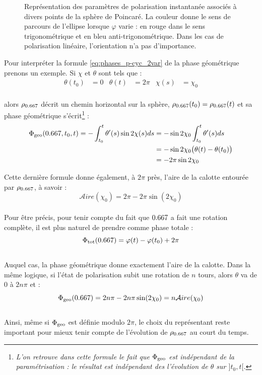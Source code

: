 \begin{figure}[H]
	
	\caption[\DONE États de polarisation associés à divers point de la sphère de Poincaré.]{Représentation des paramètres de polarisation instantanée associés à divers points de la sphère de Poincaré. La couleur donne le sens de parcours de l'ellipse lorsque $\varphi$ varie : en rouge dans le sens trigonométrique et en bleu anti-trigonométrique. Dans les cas de polarisation linéaire, l'orientation n'a pas d'importance.}
\end{figure}


Pour interpréter la formule \eqref{eq:phases_p-cyc_2var} de la phase géométrique prenons un exemple. Si $\chi$ et $\theta$ sont tels que :
\begin{align*}
	\theta(t_0) &= 0  &  \theta(t) &= 2\pi  &  \chi(s) &= \chi_0
\end{align*}
\\
alors $\rho_{\x}$ décrit un chemin horizontal sur la sphère, $\rho_{\x}(t_0) = \rho_{\x}(t)$ et sa phase géométrique s'écrit\footnote{\itshape 
	L'on retrouve dans cette formule le fait que $\Phi_{\text{\normalfont geo}}$ est indépendant de la paramétrisation : le résultat est indépendant des l'évolution de $\theta$ sur $]t_0,t[$.} :
\begin{align*}
	\phaseg(\x, t_0, t) = -\int_{t_0}^t \theta'(s) \sin 2\chi(s) ds &= - \sin 2\chi_0 \int_{t_0}^t \theta'(s) ds \\
	&= - \sin 2\chi_0 \big( \theta(t) - \theta(t_0)\big) \\
	&= - 2\pi\sin 2\chi_0
\end{align*}
\skipl

Cette dernière formule donne également, à $2\pi$ près, l’aire de la calotte entourée par $\rho_{\x}$, à savoir :
\[\mathcal{A}ire(\chi_0) = 2\pi - 2\pi \sin(2\chi_0)\]
\\
Pour être précis, pour tenir compte du fait que $\x$ a fait une rotation complète, il est plus naturel de prendre comme phase totale :
\[\phaset(\x) = \varphi(t) - \varphi(t_0) + 2\pi\]
\\
Auquel cas, la phase géométrique donne exactement l'aire de la calotte. Dans la même logique, si l'état de polarisation subit une rotation de $n$ tours, alors $\theta$ va de $0$ à $2n\pi$ et :
\[\phaseg(\x) = 2n\pi - 2n\pi\sin(2\chi_0) = n\mathcal{A}ire(\chi_0)\]
\\
Ainsi, même si $\Phi_{\text{\normalfont geo}}$ est définie modulo $2\pi$, le choix du représentant reste important pour mieux tenir compte de l'évolution de $\rho_{\x}$ au court du temps.
\\

